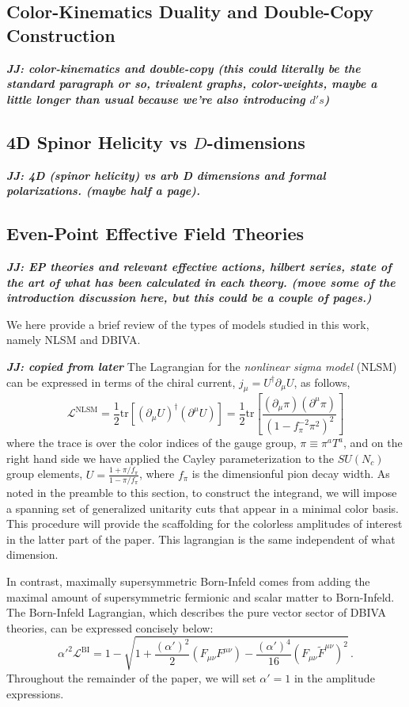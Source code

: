 \documentclass[12pt,letter]{article}
\def\be{\begin{equation}}
\def\ee{\end{equation}}
\def\dj#1{{\color{NUpurple}\it \bf JJ: #1}}
\begin{document}
\subsection{Color-Kinematics Duality and Double-Copy Construction}
\label{subsec:DCReview}

\dj{color-kinematics and double-copy (this could literally be the standard paragraph or so, trivalent graphs, color-weights, maybe a little longer than usual because we're also introducing $d's$)}

\subsection{4D Spinor Helicity vs $D$-dimensions}
\label{subsec:4DandDDReview}
\dj{4D (spinor helicity) vs arb D dimensions and  formal polarizations. (maybe half a page).  }

\subsection{Even-Point Effective Field Theories}
\label{subsec:EPEFTReview}
\dj{EP theories and relevant effective actions, hilbert series, state of the art of what has been calculated in each theory. (move some of the introduction discussion here, but this could be a couple of pages.)}

We here provide a brief review of the types of models studied in this work, namely  NLSM and DBIVA. 

\dj{copied from later}
The Lagrangian for the \textit{nonlinear sigma model} (NLSM) can be expressed in terms of the chiral current, $j_\mu = U^\dagger \partial_\mu U$, as follows,
\be
\mathcal{L}^{\text{NLSM}}= \frac{1}{2}\text{tr}[(\partial_\mu U)^\dagger (\partial ^\mu U)] = \frac{1}{2}\text{tr}\left[\frac{(\partial_\mu\pi )( \partial^\mu \pi) }{(1-f_\pi^{-2}\pi^2)^2}\right]
\ee
where the trace is over the color indices of the gauge group, $\pi \equiv \pi^a T^a$, and on the right hand side we have applied the Cayley parameterization to the $SU(N_c)$ group elements, $U= \frac{1+\pi/f_\pi}{1-\pi/f_\pi}$, where $f_\pi$ is the dimensionful pion decay width. As noted in the preamble to this section, to construct the integrand, we will impose a spanning set of generalized unitarity cuts that appear in a minimal color basis. This procedure will provide the scaffolding for the colorless amplitudes of interest in the latter part of the paper.  This lagrangian is the same independent of what dimension.

In contrast, maximally supersymmetric Born-Infeld comes from adding the maximal amount of supersymmetric fermionic and scalar matter to Born-Infeld.  The Born-Infeld Lagrangian, which describes the pure vector sector of DBIVA theories, can be expressed concisely below:
\begin{equation}
 \label{biLag}
  \alpha'^2\mathcal{L}^{\text{BI}} = 1-\sqrt{1+\frac{(\alpha')^2}{2} (F_{\mu\nu}F^{\mu\nu})-\frac{(\alpha')^4}{16}(F_{\mu\nu}\tilde{F}^{\mu\nu})^2}\,.
\end{equation}
Throughout the remainder of the paper, we will set $\alpha'=1$ in the amplitude expressions. 
\end{document}
